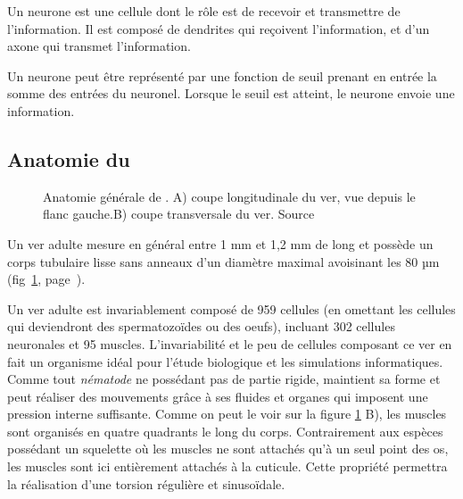 Un neurone est une cellule dont le rôle est de recevoir et transmettre de l'information.
Il est composé de dendrites qui reçoivent l'information, et d'un axone qui transmet
l'information.

Un neurone peut être représenté par une fonction de seuil prenant en entrée la somme
des entrées du neuronel. Lorsque le seuil est atteint,
le neurone envoie une information.



\subsection{Anatomie du \celeg{}} %
\label{sub:Anatomie du caeleg}

\begin{figure}[ht]
   \begin{center}
   \end{center}
   \caption[Anatomie générale de \caeleg{}]{Anatomie générale de \caeleg{}. A) coupe longitudinale du ver,
   vue depuis le flanc gauche.B) coupe transversale du ver. Source
   \cite{Boyle2009}}
   \label{fig:celegans_anatomy}
\end{figure}

Un ver \celeg{} adulte mesure en général entre 1 mm et 1,2 mm de long et
possède un corps tubulaire lisse sans anneaux d'un diamètre maximal
avoisinant les 80 µm (fig~\ref{fig:celegans_anatomy},
page~\pageref{fig:celegans_anatomy}).

Un ver adulte est invariablement composé de 959 cellules (en omettant les
cellules qui deviendront des spermatozoïdes ou des oeufs), incluant 302
cellules neuronales et 95 muscles.  \cite{Boyle2009} L'invariabilité et le peu de
cellules composant ce ver en fait un organisme idéal pour l'étude
biologique et les simulations informatiques.\\


Comme tout \textit{nématode} ne possédant pas de partie rigide, \celeg{}
maintient sa forme et peut réaliser des mouvements grâce à ses fluides et
organes qui imposent une pression interne suffisante. Comme on peut le voir sur
la figure \ref{fig:celegans_anatomy} B), les muscles sont organisés en quatre
quadrants le long du corps. Contrairement aux espèces possédant un squelette où
les muscles ne sont attachés qu'à un seul point des os, les muscles sont ici
entièrement attachés à la cuticule. Cette propriété permettra la réalisation
d'une torsion régulière et sinusoïdale.

